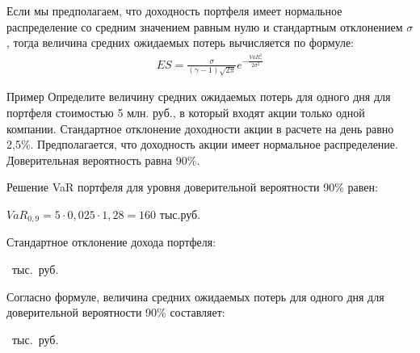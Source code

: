 \documentclass[financial_risks_lectures.tex]{subfiles}
\begin{document}
\begin{frame}
Если мы предполагаем, что доходность портфеля имеет нормальное распределение со средним значением равным нулю и стандартным отклонением $\sigma$, тогда величина средних ожидаемых потерь вычисляется по формуле:
\begin{align}
\label{es_normal}
ES=\frac{\sigma}{(\gamma-1)\sqrt{2\pi}}e^{-\frac{VaR_{\gamma}^2}{2\sigma^2}}
\end{align}

\end{frame}
\begin{frame}
\begin{exampleblock}{Пример}
Определите величину средних ожидаемых потерь для одного дня для портфеля стоимостью 5 млн. руб., в который входят акции только одной компании. Стандартное отклонение доходности акции в расчете на день равно 2,5\%. Предполагается, что доходность акции имеет нормальное распределение. Доверительная вероятность равна 90\%.
\end{exampleblock}
\end{frame}
\begin{frame}
\begin{exampleblock}{Решение}
VaR портфеля для уровня доверительной вероятности 90\% равен:

$VaR_{0,9}=5\cdot 0,025\cdot 1,28=160 \text{ тыс.руб.}$

Стандартное отклонение дохода портфеля: 

~тыс.~руб.

Согласно формуле, величина средних ожидаемых потерь для одного дня для доверительной вероятности 90\% составляет: 

~тыс.~руб.
\end{exampleblock}
\end{frame}
\end{document}
